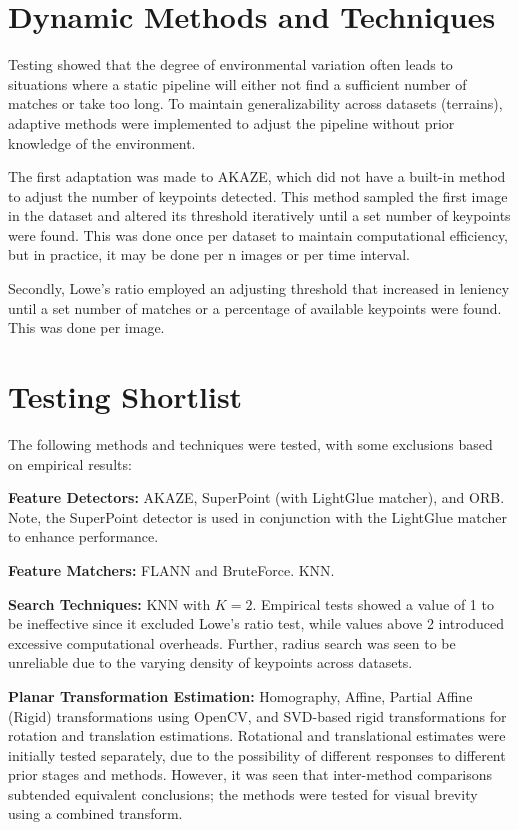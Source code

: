 \section{Dynamic Methods and Techniques}
Testing showed that the degree of environmental variation often leads to situations where a static pipeline will either not find a sufficient number of matches or take too long. To maintain generalizability across datasets (terrains), adaptive methods were implemented to adjust the pipeline without prior knowledge of the environment.

The first adaptation was made to AKAZE, which did not have a built-in method to adjust the number of keypoints detected. This method sampled the first image in the dataset and altered its threshold iteratively until a set number of keypoints were found. This was done once per dataset to maintain computational efficiency, but in practice, it may be done per n images or per time interval.

Secondly, Lowe's ratio employed an adjusting threshold that increased in leniency until a set number of matches or a percentage of available keypoints were found. This was done per image.


\section{Testing Shortlist}
\label{sec:testing_shortlist}
The following methods and techniques were tested, with some exclusions based on empirical results:

\textbf{Feature Detectors:} AKAZE, SuperPoint (with LightGlue matcher), and ORB. Note, the SuperPoint detector is used in conjunction with the LightGlue matcher to enhance performance.

\textbf{Feature Matchers:} FLANN and BruteForce. KNN.

\textbf{Search Techniques:} KNN with \( K=2 \). Empirical tests showed a value of 1 to be ineffective since it excluded Lowe's ratio test, while values above 2 introduced excessive computational overheads. Further, radius search was seen to be unreliable due to the varying density of keypoints across datasets.

\textbf{Planar Transformation Estimation:} Homography, Affine, Partial Affine (Rigid) transformations using OpenCV, and SVD-based rigid transformations for rotation and translation estimations. Rotational and translational estimates were initially tested separately, due to the possibility of different responses to different prior stages and methods. However, it was seen that inter-method comparisons subtended equivalent conclusions; the methods were tested for visual brevity using a combined transform.

